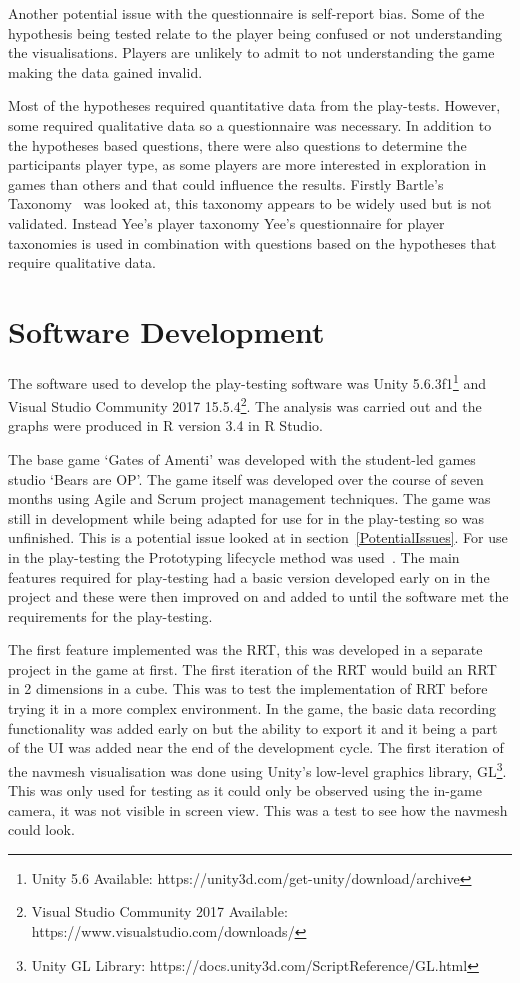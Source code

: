 \documentclass[journal]{IEEEtran}
\begin{document}
	Another potential issue with the questionnaire is self-report bias. Some of the hypothesis being tested relate to the player being confused or not understanding the visualisations. Players are unlikely to admit to not understanding the game making the data gained invalid. 
	
	Most of the hypotheses required quantitative data from the play-tests. However, some required qualitative data so a questionnaire was necessary.  In addition to the hypotheses based questions, there were also questions to determine the participants player type, as some players are more interested in exploration in games than others and that could influence the results. 
	Firstly Bartle's Taxonomy~\cite{Bartle1996} was looked at, this taxonomy appears to be widely used but is not validated. Instead Yee's player taxonomy 
	Yee's questionnaire for player taxonomies is used in combination with questions based on the hypotheses that require qualitative data. 
	
	\section{Software Development} \label{softdev}
	The software used to develop the play-testing software was Unity 5.6.3f1\footnote[3]{Unity 5.6 Available: https://unity3d.com/get-unity/download/archive} and Visual Studio Community 2017  15.5.4\footnote[4]{Visual Studio Community 2017 Available: https://www.visualstudio.com/downloads/}.  The analysis was carried out and the graphs were produced in R version 3.4 in R Studio.
	
	The base game `Gates of Amenti' was developed with the student-led games studio `Bears are OP'. The game itself was developed over the course of seven months using Agile and Scrum project management techniques. The game was still in development while being adapted for use for in the play-testing so was unfinished. This is a potential issue looked at in section~\ref{PotentialIssues}. 
	For use in the play-testing the Prototyping lifecycle method was used~\cite{isaias2015}. The main features required for play-testing had a basic version developed early on in the project and these were then improved on and added to until the software met the requirements for the play-testing.
	
	The first feature implemented was the RRT, this was developed in a separate project in the game at first. The first iteration of the RRT would build an RRT in 2 dimensions in a cube. This was to test the implementation of RRT before trying it in a more complex environment.  In the game, the basic data recording functionality was added early on but the ability to export it and it being a part of the UI was added near the end of the development cycle. The first iteration of the navmesh visualisation was done using Unity's low-level graphics library, GL\footnote[5]{Unity GL Library: https://docs.unity3d.com/ScriptReference/GL.html}. This was only used for testing as it could only be observed using the in-game camera,  it was not visible in screen view. This was a test to see how the navmesh could look.
	
\end{document}
